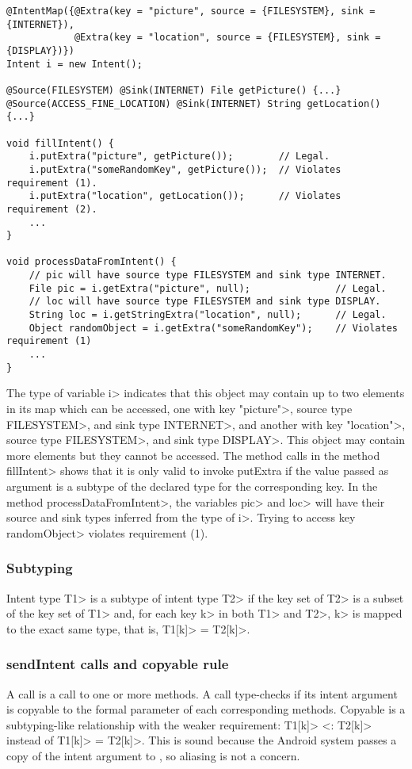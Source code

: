\begin{Verbatim}
@IntentMap({@Extra(key = "picture", source = {FILESYSTEM}, sink = {INTERNET}),
            @Extra(key = "location", source = {FILESYSTEM}, sink = {DISPLAY})}) 
Intent i = new Intent();

@Source(FILESYSTEM) @Sink(INTERNET) File getPicture() {...}
@Source(ACCESS_FINE_LOCATION) @Sink(INTERNET) String getLocation() {...}

void fillIntent() {
    i.putExtra("picture", getPicture());        // Legal.
    i.putExtra("someRandomKey", getPicture());  // Violates requirement (1).
    i.putExtra("location", getLocation());      // Violates requirement (2).
    ...
}

void processDataFromIntent() {
    // pic will have source type FILESYSTEM and sink type INTERNET.
    File pic = i.getExtra("picture", null);               // Legal.
    // loc will have source type FILESYSTEM and sink type DISPLAY.
    String loc = i.getStringExtra("location", null);      // Legal.
    Object randomObject = i.getExtra("someRandomKey");    // Violates requirement (1)
    ...
}
\end{Verbatim}

\noindent
The type of variable \<i> indicates that this object may contain up to two
elements in its map which can be accessed, one with key \<"picture">,
source type \<FILESYSTEM>, and sink type
\<INTERNET>, and another with key \<"location">, source type \<FILESYSTEM>, and sink
type \<DISPLAY>. This object may contain more elements but they cannot be
accessed. The method calls in the method \<fillIntent> shows that it is only
valid to invoke putExtra if the value passed as argument is a subtype of the
declared type for the corresponding key. In the method \<processDataFromIntent>,
the variables \<pic> and \<loc> will have their source and sink types
inferred from the type of \<i>. Trying to access key \<randomObject> violates
requirement (1).


\subsubsection{Subtyping}
Intent type \<T1> is a subtype of intent type \<T2> if the key set of 
\<T2> is a subset of the key set of \<T1> and, for each key \<k> in both 
\<T1> and \<T2>, \<k> is mapped to the exact same type, that is, 
\<T1[k]> = \<T2[k]>.

\subsubsection{sendIntent calls and copyable rule}
A \sendIntent{} call is a call to one or more \onReceive{} methods.
A \sendIntent{} call type-checks if its intent argument is
copyable to the formal parameter of each corresponding \onReceive{} methods.
Copyable is a subtyping-like relationship with the weaker requirement: 
\<T1[k]> <: \<T2[k]> instead of \<T1[k]> = \<T2[k]>.
This is sound because the Android system passes a copy of the intent argument to
\onReceive{}, so aliasing is not a concern.


